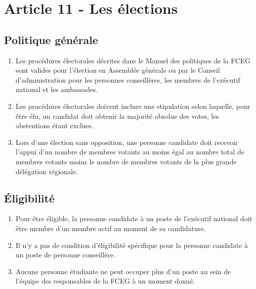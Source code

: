 \section{Article 11 - Les élections}
\label{article-11-les-elections}

\subsection{Politique générale}
\label{politique-generale}

\begin{enumerate}
 \item
  Les procédures électorales décrites dans le Manuel des politiques de la FCEG sont valides pour l'élection en Assemblée générale ou par le Conseil d'administration pour les personnes conseillères, les membres de l'exécutif national et les ambassades.
 \item
  Les procédures électorales doivent inclure une stipulation selon laquelle, pour être élu, un candidat doit obtenir la majorité absolue des votes, les abstentions étant exclues.
 \item
  Lors d'une élection sans opposition, une personne candidate doit recevoir l'appui d'un nombre de membres votants au moins égal au nombre total de membres votants moins le nombre de membres votants de la plus grande délégation régionale.
\end{enumerate}

\subsection{Éligibilité}
\label{eligibilite}

\begin{enumerate}
 \item
  Pour être éligible, la personne candidate à un poste de l'exécutif national doit être membre d'un membre actif au moment de sa candidature.
 \item
  Il n'y a pas de condition d'éligibilité spécifique pour la personne candidate à un poste de personne conseillère.
 \item
  Aucune personne étudiante ne peut occuper plus d'un poste au sein de l'équipe des responsables de la FCEG à un moment donné.
\end{enumerate}
